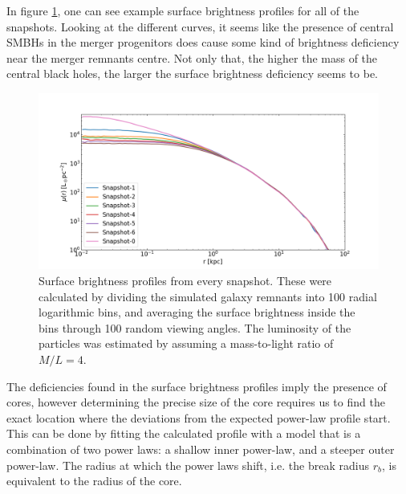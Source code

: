 \documentclass[english, oneside]{HYgradu}
\begin{document}
In figure \ref{figure:surface_brightness}, one can see example surface brightness profiles for all of the snapshots. Looking at the different curves, it seems like the presence of central SMBHs in the merger progenitors does cause some kind of brightness deficiency near the merger remnants centre. Not only that, the higher the mass of the central black holes, the larger the surface brightness deficiency seems to be.

\begin{figure}[h]
	\centering
	\includegraphics[width=\textwidth]{SurfaceBrightnessProfiles.png}
	\caption{Surface brightness profiles from every snapshot. These were calculated by dividing the simulated galaxy remnants into 100 radial logarithmic bins, and averaging the surface brightness inside the bins through 100 random viewing angles. The luminosity of the particles was estimated by assuming a mass-to-light ratio of $M/L = 4$.}
	\label{figure:surface_brightness}
\end{figure}

The deficiencies found in the surface brightness profiles imply the presence of cores, however determining the precise size of the core requires us to find the exact location where the deviations from the expected power-law profile start. This can be done by fitting the calculated profile with a model that is a combination of two power laws: a shallow inner power-law, and a steeper outer power-law. The radius at which the power laws shift, i.e. the break radius $r_b$, is equivalent to the radius of the core. 
\end{document}
